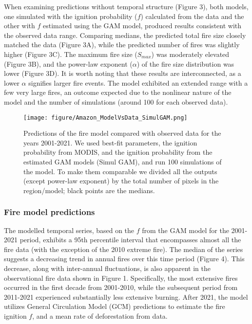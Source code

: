 \documentclass[
]{article}
\begin{document}
When examining predictions without temporal structure (Figure 3), both
models, one simulated with the ignition probability (\(f\)) calculated
from the data and the other with \(f\) estimated using the GAM model,
produced results consistent with the observed data range. Comparing
medians, the predicted total fire size closely matched the data (Figure
3A), while the predicted number of fires was slightly higher (Figure
3C). The maximum fire size (\(S_{max}\)) was moderately elevated (Figure
3B), and the power-law exponent (\(\alpha\)) of the fire size
distribution was lower (Figure 3D). It is worth noting that these
results are interconnected, as a lower \(\alpha\) signifies larger fire
events. The model exhibited an extended range with a few very large
fires, an outcome expected due to the nonlinear nature of the model and
the number of simulations (around 100 for each observed data).

\begin{figure}
\centering
\texttt{[image: figure/Amazon\_ModelVsData\_SimulGAM.png]}
\caption{Predictions of the fire model compared with observed data for
the years 2001-2021. We used best-fit parameters, the ignition
probability from MODIS, and the ignition probability from the estimated
GAM models (Simul GAM), and run 100 simulations of the model. To make
them comparable we divided all the outputs (except power-law exponent)
by the total number of pixels in the region/model; black points are the
medians.}
\end{figure}

\subsubsection{Fire model predictions}\label{fire-model-predictions}

The modelled temporal series, based on the \(f\) from the GAM model for
the 2001-2021 period, exhibits a 95th percentile interval that
encompasses almost all the fire data (with the exception of the 2010
extreme fire). The median of the series suggests a decreasing trend in
annual fires over this time period (Figure 4). This decrease, along with
inter-annual fluctuations, is also apparent in the observational fire
data shown in Figure 1. Specifically, the most extensive fires occurred
in the first decade from 2001-2010, while the subsequent period from
2011-2021 experienced substantially less extensive burning. After 2021,
the model utilizes General Circulation Model (GCM) predictions to
estimate the fire ignition \(f\), and a mean rate of deforestation from
data.
\end{document}
